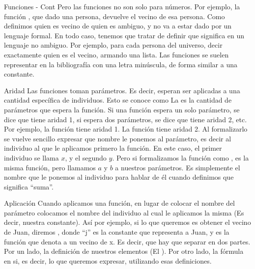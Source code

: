 
\begin{frame}{Funciones - Cont}
  Pero las funciones no son solo para números. Por ejemplo, la función
  , que dado una persona, devuelve el vecino de esa persona.
  \jump
  Como definimos quien es vecino de quien es ambiguo, y no va a estar dado por
  un lenguaje formal. En todo caso, tenemos que tratar de definir que significa
  en un lenguaje no ambiguo. Por ejemplo, para cada persona del universo, decir
  exactamente quien es el vecino, armando una lista.
  \jump
  Las funciones se suelen representar en la bibliografía con una letra minúscula,
  de forma similar a una constante.
\end{frame}


\begin{frame}{Aridad}
  Las funciones toman parámetros. Es decir, esperan ser aplicadas a una cantidad
  específica de individuos. Esto se conoce como 
  \jump
  La  es la cantidad de parámetros que espera la función. Si una función
  espera un solo parámetro, se dice que tiene aridad 1, si espera dos parámetros,
  se dice que tiene aridad 2, etc.
  \jump
  Por ejemplo, la función  tiene aridad 1. La función
   tiene aridad 2.
  \jump
  Al formalizarlo se vuelve sencillo expresar que nombre le ponemos al parámetro,
  es decir al individuo al que le aplicamos primero la función. En este caso,
  el primer individuo se llama $x$, y el segundo $y$. Pero si formalizamos la
  función como , es la misma función, pero llamamos
  $a$ y $b$ a nuestros parámetros. Es simplemente el nombre que le ponemos al
  individuo para hablar de él cuando definimos que significa ``suma''.
\end{frame}


\begin{frame}{Aplicación}
  Cuando aplicamos una función, en lugar de colocar el nombre del parámetro
  colocamos el nombre del individuo al cual le aplicamos la misma (Es decir,
  nuestra constante).
  \jump
  Así por ejemplo, si lo que queremos es obtener el vecino de Juan, diremos
  ,  donde ``j'' es la constante que representa a Juan,
  y  es la función que denota a un vecino de x.
  \jump
  Es decir, que hay que separar en dos partes. Por un lado, la definición de
  nuestros elementos (El ). Por otro lado, la fórmula en si,
  es decir, lo que queremos expresar, utilizando esas definiciones.
\end{frame}

